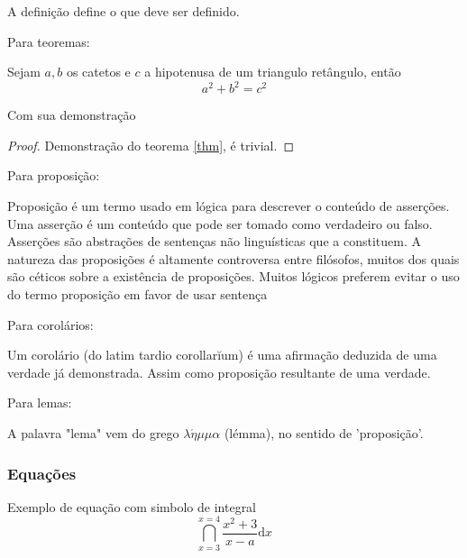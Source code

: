 \begin{defi}
A definição define o que deve ser definido.
\end{defi}

Para teoremas:
\begin{thm}
    \label{thm}
    Sejam $a, b$ os catetos e $c$ a hipotenusa de um triangulo retângulo, então $$ a^2+b^2=c^2$$
\end{thm}

Com sua demonstração
\begin{proof}
    Demonstração do teorema \ref{thm}, é trivial.
    
    \cqd %
\end{proof}

Para proposição:
\begin{prop}
Proposição é um termo usado em lógica para descrever o conteúdo de asserções. Uma asserção é um conteúdo que pode ser tomado como verdadeiro ou falso. Asserções são abstrações de sentenças não linguísticas que a constituem. A natureza das proposições é altamente controversa entre filósofos, muitos dos quais são céticos sobre a existência de proposições. Muitos lógicos preferem evitar o uso do termo proposição em favor de usar sentença
\end{prop}

Para corolários:
\begin{cor}
    \label{cor}
    Um corolário (do latim tardio corollarĭum) é uma afirmação deduzida de uma verdade já demonstrada. Assim como proposição resultante de uma verdade.
\end{cor}

Para lemas:
\begin{lem}
    \label{lem}
    A palavra "lema" vem do grego $\lambda\acute{\eta}\mu\mu\alpha$ (lémma), no sentido de 'proposição'.
\end{lem}

\subsubsection{Equações}

Exemplo de equação com simbolo de integral
\begin{equation}
 \dint_{x=3}^{x=4} \dfrac{x^2+3}{x-a} \mbox{d}x
\end{equation}



